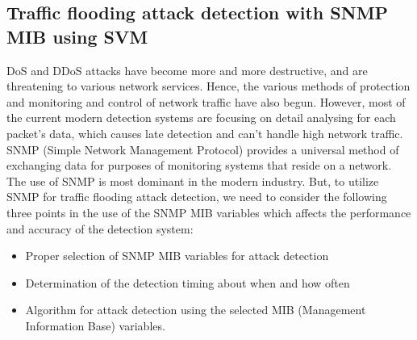 \documentclass{report}
\begin{document}
\subsection {Traffic flooding attack detection with SNMP MIB using SVM}
DoS and DDoS attacks have become more and more destructive, and are threatening to various network services. Hence, the various methods of protection and monitoring and control of network traffic have also begun.
However, most of the current modern detection systems are focusing on detail analysing for each packet’s data, which causes late detection and can’t handle high network traffic.
  \hfill \break
SNMP (Simple Network Management Protocol)\cite{snmp}  provides a universal method of exchanging data for purposes of monitoring systems that reside on a network. The use of SNMP is most dominant in the modern industry. But, to utilize SNMP for traffic flooding attack detection, we need to consider the following three points in the use of the SNMP MIB variables which affects the performance and accuracy of the detection system:
\begin{itemize}
\item Proper selection of SNMP MIB variables for attack detection
\item Determination of the detection timing about when and how often
\item Algorithm for attack detection using the selected MIB (Management Information Base) variables.
\end{itemize}
  \hfill \break
\end{document}
